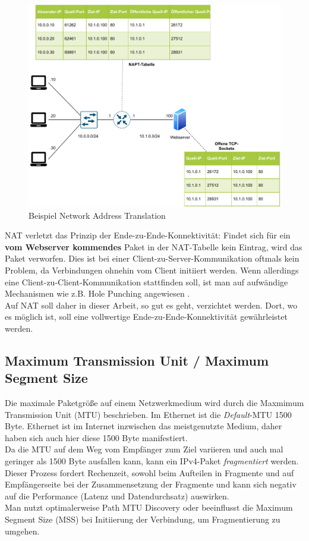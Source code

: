 \begin{figure}[h]
  \centering
  \includegraphics[scale=0.90]{Figures/napt.pdf}
  \caption{Beispiel Network Address Translation}
  \label{grafik: napt}
\end{figure}\FloatBarrier

NAT verletzt das Prinzip der Ende-zu-Ende-Konnektivität: Findet sich für ein \textbf{vom Webserver kommendes} Paket in der NAT-Tabelle kein Eintrag, wird das Paket verworfen. Dies ist bei einer Client-zu-Server-Kommunikation oftmals kein Problem, da Verbindungen ohnehin vom Client initiiert werden. Wenn allerdings eine Client-zu-Client-Kommunikation stattfinden soll, ist man auf aufwändige Mechanismen wie z.B. Hole Punching angewiesen \cite[S.317]{Fall2011}.\\
Auf NAT soll daher in dieser Arbeit, so gut es geht, verzichtet werden. Dort, wo es möglich ist, soll eine vollwertige Ende-zu-Ende-Konnektivität gewährleistet werden.

\subsection{Maximum Transmission Unit / Maximum Segment Size}
Die maximale Paketgröße auf einem Netzwerkmedium wird durch die Maxmimum Transmission Unit (MTU) beschrieben. Im Ethernet ist die \textit{Default}-MTU 1500 Byte.\cite[S.86]{Fall2011} Ethernet ist im Internet inzwischen das meistgenutzte Medium, daher haben sich auch hier diese 1500 Byte manifestiert.\\
Da die MTU auf dem Weg vom Empfänger zum Ziel variieren und auch mal geringer als 1500 Byte ausfallen kann, kann ein IPv4-Paket \textit{fragmentiert} werden. Dieser Prozess fordert Rechenzeit, sowohl beim Aufteilen in Fragmente und auf Empfängerseite bei der Zusammensetzung der Fragmente und kann sich negativ auf die Performance (Latenz und Datendurchsatz) auswirken.\\
Man nutzt optimalerweise Path MTU Discovery oder beeinflusst die Maximum Segment Size (MSS) bei Initiierung der Verbindung, um Fragmentierung zu umgehen.

